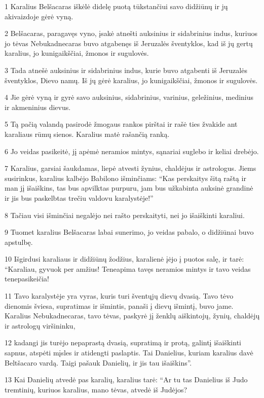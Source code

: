 \par 1 Karalius Belšacaras iškėlė didelę puotą tūkstančiui savo didžiūnų ir jų akivaizdoje gėrė vyną. 
\par 2 Belšacaras, paragavęs vyno, įsakė atnešti auksinius ir sidabrinius indus, kuriuos jo tėvas Nebukadnecaras buvo atgabenęs iš Jeruzalės šventyklos, kad iš jų gertų karalius, jo kunigaikščiai, žmonos ir sugulovės. 
\par 3 Tada atnešė auksinius ir sidabrinius indus, kurie buvo atgabenti iš Jeruzalės šventyklos, Dievo namų. Iš jų gėrė karalius, jo kunigaikščiai, žmonos ir sugulovės. 
\par 4 Jie gėrė vyną ir gyrė savo auksinius, sidabrinius, varinius, geležinius, medinius ir akmeninius dievus. 
\par 5 Tą pačią valandą pasirodė žmogaus rankos pirštai ir rašė ties žvakide ant karaliaus rūmų sienos. Karalius matė rašančią ranką. 
\par 6 Jo veidas pasikeitė, jį apėmė neramios mintys, sąnariai suglebo ir keliai drebėjo. 
\par 7 Karalius, garsiai šaukdamas, liepė atvesti žynius, chaldėjus ir astrologus. Jiems susirinkus, karalius kalbėjo Babilono išminčiams: “Kas perskaitys šitą raštą ir man jį išaiškins, tas bus apvilktas purpuru, jam bus užkabinta auksinė grandinė ir jis bus paskelbtas trečiu valdovu karalystėje!” 
\par 8 Tačiau visi išminčiai negalėjo nei rašto perskaityti, nei jo išaiškinti karaliui. 
\par 9 Tuomet karalius Belšacaras labai sunerimo, jo veidas pabalo, o didžiūnai buvo apstulbę. 
\par 10 Išgirdusi karaliaus ir didžiūnų žodžius, karalienė įėjo į puotos salę, ir tarė: “Karaliau, gyvuok per amžius! Teneapima tavęs neramios mintys ir tavo veidas tenepasikeičia! 
\par 11 Tavo karalystėje yra vyras, kuris turi šventųjų dievų dvasią. Tavo tėvo dienomis šviesa, supratimas ir išmintis, panaši į dievų išmintį, buvo jame. Karalius Nebukadnecaras, tavo tėvas, paskyrė jį ženklų aiškintojų, žynių, chaldėjų ir astrologų viršininku, 
\par 12 kadangi jis turėjo nepaprastą dvasią, supratimą ir protą, galintį išaiškinti sapnus, atspėti mįsles ir atidengti paslaptis. Tai Danielius, kuriam karalius davė Beltšacaro vardą. Taigi pašauk Danielių, ir jis tau išaiškins”. 
\par 13 Kai Danielių atvedė pas karalių, karalius tarė: “Ar tu tas Danielius iš Judo tremtinių, kuriuos karalius, mano tėvas, atvedė iš Judėjos? 
